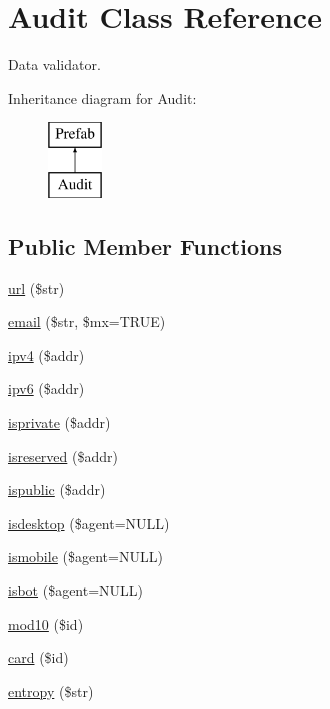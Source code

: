\hypertarget{class_audit}{}\section{Audit Class Reference}
\label{class_audit}


Data validator.  


Inheritance diagram for Audit\+:\begin{figure}[H]
\begin{center}
\leavevmode
\includegraphics[height=2.000000cm]{class_audit}
\end{center}
\end{figure}
\subsection*{Public Member Functions}
\begin{DoxyCompactItemize}
\item 
\hyperlink{class_audit_aef8b9a57041dec7db0ff956bba1d8b3f}{url} (\$str)
\item 
\hyperlink{class_audit_a369b2fd023996c185845f4993d03f530}{email} (\$str, \$mx=T\+R\+UE)
\item 
\hyperlink{class_audit_a2c914582b13324bf624b1cd1763f258e}{ipv4} (\$addr)
\item 
\hyperlink{class_audit_a74a69adbf8a934eee039f323c864a508}{ipv6} (\$addr)
\item 
\hyperlink{class_audit_a9bb5536f5e8cfe33672340a407daa387}{isprivate} (\$addr)
\item 
\hyperlink{class_audit_a352a97e07f1d2ebb7dcc009da6c67825}{isreserved} (\$addr)
\item 
\hyperlink{class_audit_a421f0166ffee8171ee3948970abcecad}{ispublic} (\$addr)
\item 
\hyperlink{class_audit_ac6c1cda9920c8236cd00d10bffb2890f}{isdesktop} (\$agent=N\+U\+LL)
\item 
\hyperlink{class_audit_afbca2bf25d7295857c0e7b161ab21beb}{ismobile} (\$agent=N\+U\+LL)
\item 
\hyperlink{class_audit_a7d73389ff426668e83b171fd662018ad}{isbot} (\$agent=N\+U\+LL)
\item 
\hyperlink{class_audit_a80595e89a7b191abab586fcd73e54c6a}{mod10} (\$id)
\item 
\hyperlink{class_audit_a631df11fda2fb8e663e24f804c978367}{card} (\$id)
\item 
\hyperlink{class_audit_ac1c0abeb7a7ac6bf923e6e0abdfe336e}{entropy} (\$str)
\end{DoxyCompactItemize}
